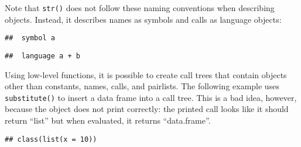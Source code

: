 Note that \texttt{str()} does not follow these naming conventions when
describing objects. Instead, it describes names as symbols and calls as
language objects:

\begin{Shaded}
\begin{Highlighting}[]
\NormalTok{(}
\end{Highlighting}
\end{Shaded}

\begin{verbatim}
##  symbol a
\end{verbatim}

\begin{Shaded}
\begin{Highlighting}[]
\NormalTok{(}\OperatorTok{+}\StringTok{ }
\end{Highlighting}
\end{Shaded}

\begin{verbatim}
##  language a + b
\end{verbatim}

Using low-level functions, it is possible to create call trees that
contain objects other than constants, names, calls, and pairlists. The
following example uses \texttt{substitute()} to insert a data frame into
a call tree. This is a bad idea, however, because the object does not
print correctly: the printed call looks like it should return ``list''
but when evaluated, it returns ``data.frame''. 

\begin{Shaded}
\begin{Highlighting}[]
\StringTok{ }\NormalTok{(}\NormalTok{(} \NormalTok{(} \NormalTok{)))}
\end{Highlighting}
\end{Shaded}

\begin{verbatim}
## class(list(x = 10))
\end{verbatim}

\begin{Shaded}
\begin{Highlighting}[]
\end{Highlighting}
\end{Shaded}

